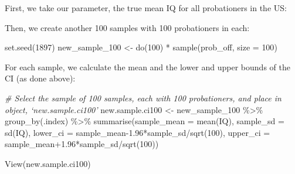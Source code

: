 \documentclass[
]{book}
\newenvironment{Shaded}{\begin{snugshade}}{\end{snugshade}}
\newcommand{\AttributeTok}[1]{\textcolor[rgb]{0.77,0.63,0.00}{#1}}
\newcommand{\CommentTok}[1]{\textcolor[rgb]{0.56,0.35,0.01}{\textit{#1}}}
\newcommand{\DecValTok}[1]{\textcolor[rgb]{0.00,0.00,0.81}{#1}}
\newcommand{\FloatTok}[1]{\textcolor[rgb]{0.00,0.00,0.81}{#1}}
\newcommand{\FunctionTok}[1]{\textcolor[rgb]{0.00,0.00,0.00}{#1}}
\newcommand{\NormalTok}[1]{#1}
\newcommand{\OtherTok}[1]{\textcolor[rgb]{0.56,0.35,0.01}{#1}}
\newcommand{\SpecialCharTok}[1]{\textcolor[rgb]{0.00,0.00,0.00}{#1}}
\begin{document}
First, we take our parameter, the true mean IQ for all probationers in the US:

\begin{Shaded}
\end{Shaded}

Then, we create another 100 samples with 100 probationers in each:

\begin{Shaded}
\begin{Highlighting}[]
\FunctionTok{set.seed}\NormalTok{(}\DecValTok{1897}\NormalTok{)}
\NormalTok{new\_sample\_100 }\OtherTok{\textless{}{-}} \FunctionTok{do}\NormalTok{(}\DecValTok{100}\NormalTok{) }\SpecialCharTok{*} \FunctionTok{sample}\NormalTok{(prob\_off, }\AttributeTok{size =} \DecValTok{100}\NormalTok{)}
\end{Highlighting}
\end{Shaded}

For each sample, we calculate the mean and the lower and upper bounds of the CI (as done above):

\begin{Shaded}
\begin{Highlighting}[]
\CommentTok{\# Select the sample of 100 samples, each with 100 probationers, and place in object, ‘new.sample.ci100’}
\NormalTok{new.sample.ci100 }\OtherTok{\textless{}{-}}\NormalTok{ new\_sample\_100 }\SpecialCharTok{\%\textgreater{}\%} 
  \FunctionTok{group\_by}\NormalTok{(.index) }\SpecialCharTok{\%\textgreater{}\%} 
  \FunctionTok{summarise}\NormalTok{(}\AttributeTok{sample\_mean =} \FunctionTok{mean}\NormalTok{(IQ), }
         \AttributeTok{sample\_sd =} \FunctionTok{sd}\NormalTok{(IQ),}
         \AttributeTok{lower\_ci =}\NormalTok{ sample\_mean}\FloatTok{{-}1.96}\SpecialCharTok{*}\NormalTok{sample\_sd}\SpecialCharTok{/}\FunctionTok{sqrt}\NormalTok{(}\DecValTok{100}\NormalTok{), }
         \AttributeTok{upper\_ci =}\NormalTok{ sample\_mean}\FloatTok{+1.96}\SpecialCharTok{*}\NormalTok{sample\_sd}\SpecialCharTok{/}\FunctionTok{sqrt}\NormalTok{(}\DecValTok{100}\NormalTok{)) }
\end{Highlighting}
\end{Shaded}

\begin{Shaded}
\begin{Highlighting}[]
\FunctionTok{View}\NormalTok{(new.sample.ci100)}
\end{Highlighting}
\end{Shaded}
\end{document}
